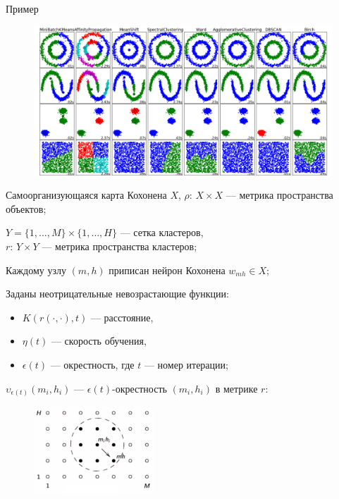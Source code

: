 \documentclass{beamer}
\begin{document}
\begin{frame}{Пример}
\begin{figure}
   \begin{center}
   \includegraphics[scale = 0.24]{methods.png}
   \end{center}
   \end{figure}
\end{frame}

\begin{frame}{Самоорганизующаяся карта Кохонена}
	$X$, $\rho:\,X \times X$ --- метрика пространства объектов;

	\vspace{.15cm}
	$Y=\{1,\dots,M\} \times \{1,\dots,H\}$ --- сетка кластеров,\\
	$r: \, Y \times Y$ --- метрика пространства кластеров;

	\vspace{.15cm}
	Каждому узлу $(m,h)$ приписан нейрон Кохонена $w_{mh}\in X$;

	\vspace{.15cm}
	Заданы неотрицательные невозрастающие функции:
	\begin{itemize}
	    \item $K(r(\cdot,\cdot),t)$ --- расстояние,
	    \item $\eta(t)$ --- скорость обучения,
	    \item $\epsilon(t)$ --- окрестность, где $t$ --- номер итерации;
	\end{itemize}

	\vspace{.15cm}
	$\upsilon_{\epsilon(t)}(m_i,h_i)$ --- $\epsilon(t)$-окрестность $(m_i,h_i)$ в метрике $r$:
	\begin{figure}
	\includegraphics[width=0.4\textwidth]{karta.pdf}
	\end{figure}
\end{frame}
\end{document}
